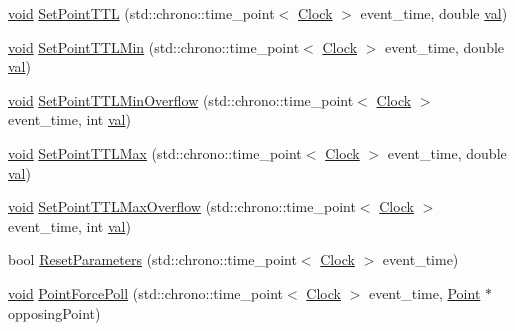 \begin{DoxyCompactItemize}
\mbox{\hyperlink{glad_8h_a950fc91edb4504f62f1c577bf4727c29}{void}} \mbox{\hyperlink{class_point_a60ccff89b647d069146a596b8c43d123}{Set\+Point\+T\+TL}} (std\+::chrono\+::time\+\_\+point$<$ \mbox{\hyperlink{universe_8h_a0ef8d951d1ca5ab3cfaf7ab4c7a6fd80}{Clock}} $>$ event\+\_\+time, double \mbox{\hyperlink{glad_8h_a26942fd2ed566ef553eae82d2c109c8f}{val}})
\item 
\mbox{\hyperlink{glad_8h_a950fc91edb4504f62f1c577bf4727c29}{void}} \mbox{\hyperlink{class_point_ae36f75ff4e27742000acd8cad7743614}{Set\+Point\+T\+T\+L\+Min}} (std\+::chrono\+::time\+\_\+point$<$ \mbox{\hyperlink{universe_8h_a0ef8d951d1ca5ab3cfaf7ab4c7a6fd80}{Clock}} $>$ event\+\_\+time, double \mbox{\hyperlink{glad_8h_a26942fd2ed566ef553eae82d2c109c8f}{val}})
\item 
\mbox{\hyperlink{glad_8h_a950fc91edb4504f62f1c577bf4727c29}{void}} \mbox{\hyperlink{class_point_a167884648fa6ce217472edfdbf515ac3}{Set\+Point\+T\+T\+L\+Min\+Overflow}} (std\+::chrono\+::time\+\_\+point$<$ \mbox{\hyperlink{universe_8h_a0ef8d951d1ca5ab3cfaf7ab4c7a6fd80}{Clock}} $>$ event\+\_\+time, int \mbox{\hyperlink{glad_8h_a26942fd2ed566ef553eae82d2c109c8f}{val}})
\item 
\mbox{\hyperlink{glad_8h_a950fc91edb4504f62f1c577bf4727c29}{void}} \mbox{\hyperlink{class_point_a1227b110f1fa0aab599f9374ea5ec484}{Set\+Point\+T\+T\+L\+Max}} (std\+::chrono\+::time\+\_\+point$<$ \mbox{\hyperlink{universe_8h_a0ef8d951d1ca5ab3cfaf7ab4c7a6fd80}{Clock}} $>$ event\+\_\+time, double \mbox{\hyperlink{glad_8h_a26942fd2ed566ef553eae82d2c109c8f}{val}})
\item 
\mbox{\hyperlink{glad_8h_a950fc91edb4504f62f1c577bf4727c29}{void}} \mbox{\hyperlink{class_point_a6a7ca43c551232d5c5d0f5a5d8603c9e}{Set\+Point\+T\+T\+L\+Max\+Overflow}} (std\+::chrono\+::time\+\_\+point$<$ \mbox{\hyperlink{universe_8h_a0ef8d951d1ca5ab3cfaf7ab4c7a6fd80}{Clock}} $>$ event\+\_\+time, int \mbox{\hyperlink{glad_8h_a26942fd2ed566ef553eae82d2c109c8f}{val}})
\item 
bool \mbox{\hyperlink{class_point_a123c78bef71f74d71bc833709a38709c}{Reset\+Parameters}} (std\+::chrono\+::time\+\_\+point$<$ \mbox{\hyperlink{universe_8h_a0ef8d951d1ca5ab3cfaf7ab4c7a6fd80}{Clock}} $>$ event\+\_\+time)
\item 
\mbox{\hyperlink{glad_8h_a950fc91edb4504f62f1c577bf4727c29}{void}} \mbox{\hyperlink{class_point_a414f2215f758cd69fa67e8135ecc4fe2}{Point\+Force\+Poll}} (std\+::chrono\+::time\+\_\+point$<$ \mbox{\hyperlink{universe_8h_a0ef8d951d1ca5ab3cfaf7ab4c7a6fd80}{Clock}} $>$ event\+\_\+time, \mbox{\hyperlink{class_point}{Point}} $\ast$opposing\+Point)

\end{DoxyCompactItemize}
